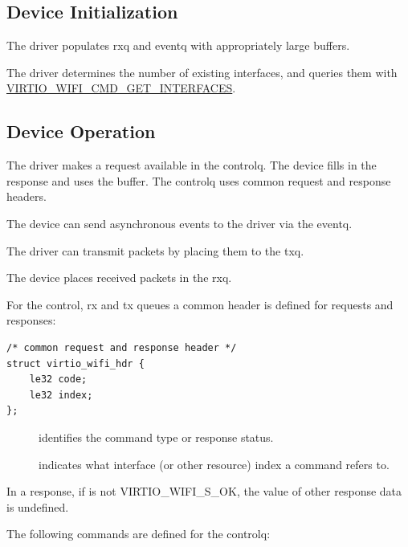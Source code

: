 \subsection{Device Initialization}\label{sec:Device Types / 802.11 Device / Device Initialization}

The driver populates rxq and eventq with appropriately large buffers.

The driver determines the number of existing interfaces, and queries them with \hyperref[sec:Device Types / 802.11 Device / Device Operation / Interface Management / Querying Interfaces]{VIRTIO_WIFI_CMD_GET_INTERFACES}.

\subsection{Device Operation}\label{sec:Device Types / 802.11 Device / Device Operation}

The driver makes a request available in the controlq. The device fills
in the response and uses the buffer. The controlq uses common request
and response headers.

The device can send asynchronous events to the driver via the eventq.

The driver can transmit packets by placing them to the txq.

The device places received packets in the rxq.

For the control, rx and tx queues a common header is defined for requests and responses:

\begin{lstlisting}
/* common request and response header */
struct virtio_wifi_hdr {
	le32 code;
	le32 index;
};
\end{lstlisting}

\begin{description}
\item[] identifies the command type or response status.
\item[] indicates what interface (or other resource) index a
command refers to.
\end{description}

In a response, if  is not VIRTIO_WIFI_S_OK, the value of other response
data is undefined.

The following commands are defined for the controlq:

